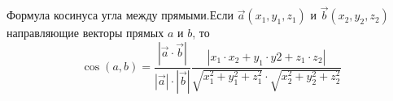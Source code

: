 \documentclass[preview]{standalone}
\begin{document}
\begin{center}
Формула косинуса угла между прямыми.Если $\vec{a}(x_1, y_1, z_1)$ и $\vec{b}(x_2, y_2, z_2)$направляющие векторы прямых $a$ и $b$, то$$\cos(a,b) = \frac{|\vec{a} \cdot \vec{b}|}{|\vec{a}|\cdot|\vec{b}|}\frac{|x_1 \cdot x_2 + y_1 \cdot y2 + z_1 \cdot z_2|}{\sqrt{x_1^2 + y_1^2 + z_1^2} \cdot \sqrt{x_2^2 + y_2^2 + z_2^2}}$$
\end{center}
\end{document}
